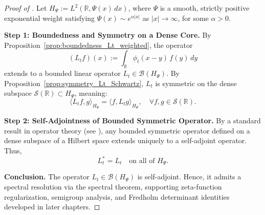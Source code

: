 \begin{proof}[Proof of ]
Let \( H_\Psi := L^2(\mathbb{R}, \Psi(x)\, dx) \), where \( \Psi \) is a smooth, strictly positive exponential weight satisfying \( \Psi(x) \sim e^{\alpha|x|} \) as \( |x| \to \infty \), for some \( \alpha > 0 \).

\medskip
\noindent\textbf{Step 1: Boundedness and Symmetry on a Dense Core.}
By Proposition~\ref{prop:boundedness_Lt_weighted}, the operator
\[
(L_t f)(x) := \int_{\mathbb{R}} \phi_t(x - y)\, f(y)\, dy
\]
extends to a bounded linear operator \( L_t \in \mathcal{B}(H_\Psi) \). By Proposition~\ref{prop:symmetry_Lt_Schwartz}, \( L_t \) is symmetric on the dense subspace \( \mathcal{S}(\mathbb{R}) \subset H_\Psi \), meaning:
\[
\langle L_t f, g \rangle_{H_\Psi} = \langle f, L_t g \rangle_{H_\Psi}, \quad \forall f, g \in \mathcal{S}(\mathbb{R}).
\]

\medskip
\noindent\textbf{Step 2: Self-Adjointness of Bounded Symmetric Operator.}
By a standard result in operator theory (see \cite[Theorem~VI.1]{ReedSimon1980I}), any bounded symmetric operator defined on a dense subspace of a Hilbert space extends uniquely to a self-adjoint operator. Thus,
\[
L_t^* = L_t \quad \text{on all of } H_\Psi.
\]

\medskip
\noindent\textbf{Conclusion.}
The operator \( L_t \in \mathcal{B}(H_\Psi) \) is self-adjoint. Hence, it admits a spectral resolution via the spectral theorem, supporting zeta-function regularization, semigroup analysis, and Fredholm determinant identities developed in later chapters.
\end{proof}
